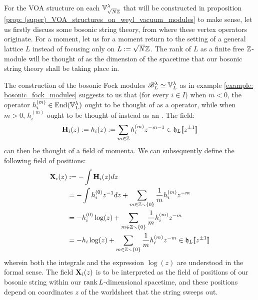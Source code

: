             \begin{remark}
                For the VOA structure on each $\mathbb{V}_{\sqrt{N} \mathbb{Z}}^{\lambda}$ that will be constructed in proposition \ref{prop: (super)_VOA_structures_on_weyl_vacuum_modules} to make sense, let us firstly discuss some bosonic string theory, from where these vertex operators originate. For a moment, let us for a moment return to the setting of a general lattice $L$ instead of focusing only on $L := \sqrt{N} \mathbb{Z}$. The rank of $L$ as a finite free $\mathbb{Z}$-module will be thought of as the dimension of the spacetime that our bosonic string theory shall be taking place in. 

                The construction of the bosonic Fock modules $\mathscr{B}_L^{\lambda} \simeq \mathbb{V}_L^{\lambda}$ as in example \ref{example: bosonic_fock_modules} suggests to us that (for every $i \in I$) when $m < 0$, the operator $h_i^{(m)} \in \mathrm{End}(\mathbb{V}_L^{\lambda})$ ought to be thought of as a  operator, while when $m > 0$, $h_i^{(m)}$ ought to be thought of instead as an . The field:
                    $$\mathbf{H}_i(z) := h_i(z) := \sum_{m \in \mathbb{Z}} h_i^{(m)} z^{-m - 1} \in \mathfrak{h}_L[\![z^{\pm 1}]\!]$$
                can then be thought of a field of momenta. We can subsequently define the following field of positions:
                    $$
                        \begin{aligned}
                            \mathbf{X}_i(z) & := -\int \mathbf{H}_i(z) dz
                            \\
                            & = -\int h_i^{(0)} z^{-1} dz + \sum_{m \in \mathbb{Z} \smallsetminus \{0\}} \frac1m h_i^{(m)} z^{-m}
                            \\
                            & = -h_i^{(0)} \log(z) + \sum_{m \in \mathbb{Z} \smallsetminus \{0\}} \frac1m h_i^{(m)} z^{-m}
                            \\
                            & = -h_i \log(z) + \sum_{m \in \mathbb{Z} \smallsetminus \{0\}} \frac1m h_i^{(m)} z^{-m} \in \mathfrak{h}_L[\![z^{\pm 1}]\!]
                        \end{aligned}
                    $$
                wherein both the integrals and the expression $\log(z)$ are understood in the formal sense. The field $\mathbf{X}_i(z)$ is to be interpreted as the field of positions of our bosonic string within our $\operatorname{rank} L$-dimensional spacetime, and these positions depend on coordinates $z$ of the worldsheet that the string sweeps out.
                

\end{remark}
